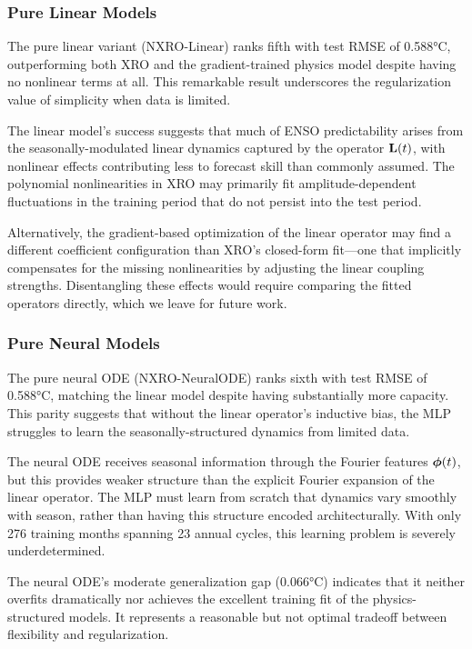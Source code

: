 \subsubsection{Pure Linear Models}

The pure linear variant (NXRO-Linear) ranks fifth with test RMSE of 0.588°C, outperforming both XRO and the gradient-trained physics model despite having no nonlinear terms at all. This remarkable result underscores the regularization value of simplicity when data is limited.

The linear model's success suggests that much of ENSO predictability arises from the seasonally-modulated linear dynamics captured by the operator $\mathbf{L}(t)$, with nonlinear effects contributing less to forecast skill than commonly assumed. The polynomial nonlinearities in XRO may primarily fit amplitude-dependent fluctuations in the training period that do not persist into the test period.

Alternatively, the gradient-based optimization of the linear operator may find a different coefficient configuration than XRO's closed-form fit---one that implicitly compensates for the missing nonlinearities by adjusting the linear coupling strengths. Disentangling these effects would require comparing the fitted operators directly, which we leave for future work.

\subsubsection{Pure Neural Models}

The pure neural ODE (NXRO-NeuralODE) ranks sixth with test RMSE of 0.588°C, matching the linear model despite having substantially more capacity. This parity suggests that without the linear operator's inductive bias, the MLP struggles to learn the seasonally-structured dynamics from limited data.

The neural ODE receives seasonal information through the Fourier features $\boldsymbol{\phi}(t)$, but this provides weaker structure than the explicit Fourier expansion of the linear operator. The MLP must learn from scratch that dynamics vary smoothly with season, rather than having this structure encoded architecturally. With only 276 training months spanning 23 annual cycles, this learning problem is severely underdetermined.

The neural ODE's moderate generalization gap (0.066°C) indicates that it neither overfits dramatically nor achieves the excellent training fit of the physics-structured models. It represents a reasonable but not optimal tradeoff between flexibility and regularization.


